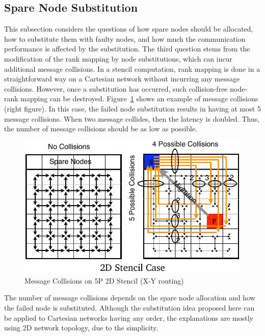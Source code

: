 \subsection{Spare Node Substitution}

This subsection considers the questions of how spare nodes should be
allocated, how to substitute them with faulty nodes, and how much the
communication performance is affected by the substitution.
The third question stems from the modification of the rank mapping by
node substitutions, which can incur additional message collisions.
In a stencil computation, rank mapping is done in a
straightforward way on a Cartesian network without incurring any
message collisions. However, once a substitution has occurred, such
collision-free node-rank mapping can be
destroyed. Figure~\ref{fig:message-collisions} shows an example of
message collisions (right figure). In this case, the failed node
substitution results in having 
at most 5 message collisions. When two message
collides, then the latency is doubled. Thus, the number of message
collisions should be as low as possible.

\begin{figure}[ht]
\begin{center}
\includegraphics[width=0.7\columnwidth]{Figs/Collisions.pdf}
  \caption{Message Collisions on 5P 2D Stencil (X-Y routing)}
  \label{fig:message-collisions}
\end{center}
\end{figure}

The number of message collisions depends on the spare node allocation
and how the failed node is substituted. Although the substitution idea
proposed here can be applied to Cartesian networks having any order, the
explanations are mostly using 2D network topology, due to the
simplicity. 

